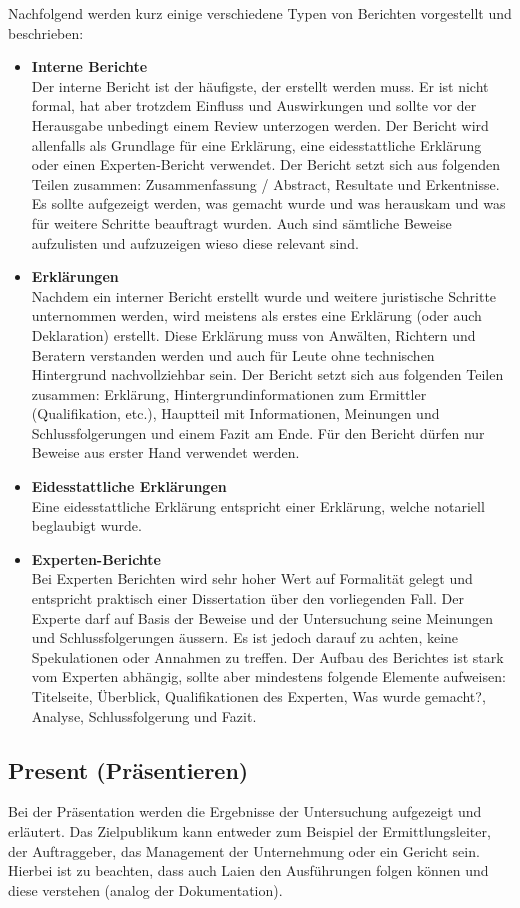 Nachfolgend werden kurz einige verschiedene Typen von Berichten vorgestellt und beschrieben:
\begin{itemize}
\item \textbf{Interne Berichte}\\
Der interne Bericht ist der häufigste, der erstellt werden muss. Er ist nicht formal, hat aber trotzdem Einfluss und Auswirkungen und sollte vor der Herausgabe unbedingt einem Review unterzogen werden. Der Bericht wird allenfalls als Grundlage für eine Erklärung, eine eidesstattliche Erklärung oder einen Experten-Bericht verwendet. Der Bericht setzt sich aus folgenden Teilen zusammen: Zusammenfassung / Abstract, Resultate und Erkentnisse. Es sollte aufgezeigt werden, was gemacht wurde und was herauskam und was für weitere Schritte beauftragt wurden. Auch sind sämtliche Beweise aufzulisten und aufzuzeigen wieso diese relevant sind.
\item \textbf{Erklärungen}\\
Nachdem ein interner Bericht erstellt wurde und weitere juristische Schritte unternommen werden, wird meistens als erstes eine Erklärung (oder auch Deklaration) erstellt. Diese Erklärung muss von Anwälten, Richtern und Beratern verstanden werden und auch für Leute ohne technischen Hintergrund nachvollziehbar sein. Der Bericht setzt sich aus folgenden Teilen zusammen: Erklärung, Hintergrundinformationen zum Ermittler (Qualifikation, etc.), Hauptteil mit Informationen, Meinungen und Schlussfolgerungen und einem Fazit am Ende. Für den Bericht dürfen nur Beweise aus erster Hand verwendet werden.
\item \textbf{Eidesstattliche Erklärungen}\\
Eine eidesstattliche Erklärung entspricht einer Erklärung, welche notariell beglaubigt wurde.
\item \textbf{Experten-Berichte}\\
Bei Experten Berichten wird sehr hoher Wert auf Formalität gelegt und entspricht praktisch einer Dissertation über den vorliegenden Fall. Der Experte darf auf Basis der Beweise und der Untersuchung seine Meinungen und Schlussfolgerungen äussern. Es ist jedoch darauf zu achten, keine Spekulationen oder Annahmen zu treffen. Der Aufbau des Berichtes ist stark vom Experten abhängig, sollte aber mindestens folgende Elemente aufweisen: Titelseite, Überblick, Qualifikationen des Experten, Was wurde gemacht?, Analyse, Schlussfolgerung und Fazit.
\end{itemize}

\subsection{Present (Präsentieren)}
Bei der Präsentation werden die Ergebnisse der Untersuchung aufgezeigt und erläutert. Das Zielpublikum kann entweder zum Beispiel der Ermittlungsleiter, der Auftraggeber, das Management der Unternehmung oder ein Gericht sein. Hierbei ist zu beachten, dass auch Laien den Ausführungen folgen können und diese verstehen (analog der Dokumentation).

